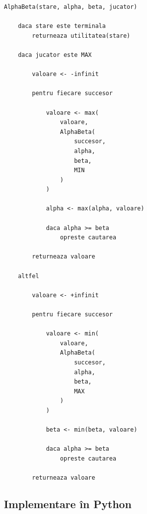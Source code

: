 \documentclass[12pt,a4paper]{article}
\begin{document}
\begin{verbatim}
AlphaBeta(stare, alpha, beta, jucator)

    daca stare este terminala
        returneaza utilitatea(stare)

    daca jucator este MAX

        valoare <- -infinit

        pentru fiecare succesor

            valoare <- max(
                valoare,
                AlphaBeta(
                    succesor,
                    alpha,
                    beta,
                    MIN
                )
            )

            alpha <- max(alpha, valoare)

            daca alpha >= beta
                opreste cautarea

        returneaza valoare

    altfel

        valoare <- +infinit

        pentru fiecare succesor

            valoare <- min(
                valoare,
                AlphaBeta(
                    succesor,
                    alpha,
                    beta,
                    MAX
                )
            )

            beta <- min(beta, valoare)

            daca alpha >= beta
                opreste cautarea

        returneaza valoare
\end{verbatim}

\subsection{Implementare în Python}
\end{document}
